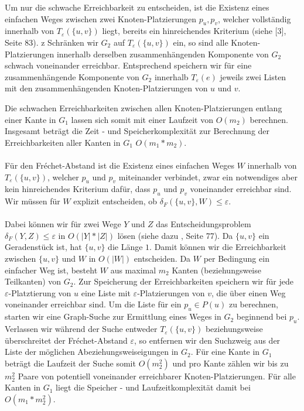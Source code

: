 \documentclass[a4paper, 12pt, twoside]{article}
\theoremstyle{Format1} %
\begin{document}
Um nur die schwache Erreichbarkeit zu entscheiden, ist die Existenz eines einfachen Weges zwischen zwei Knoten-Platzierungen
$p_u,p_v$, welcher vollständig innerhalb von $T_{\varepsilon}(\{u,v\})$ liegt, bereits ein hinreichendes Kriterium (siehe [3], Seite 83).
z
Schränken wir $G_2$ auf $T_{\varepsilon}(\{u,v\})$ ein, so sind alle Knoten-Platzierungen innerhalb derselben zusammenhängenden Komponente von $G_2$
schwach voneinander erreichbar. Entsprechend speichern wir für eine zusammenhängende Komponente von $G_2$ innerhalb $T_{\varepsilon}(e)$ jeweils zwei Listen mit den
zusammenhängenden Knoten-Platzierungen von $u$ und $v$.

Die schwachen Erreichbarkeiten zwischen allen Knoten-Platzierungen entlang einer Kante in $G_1$ lassen sich somit mit einer Laufzeit von $O(m_2)$ berechnen.
Insgesamt beträgt die Zeit - und Speicherkomplexität zur Berechnung der Erreichbarkeiten aller Kanten in $G_1$ $O(m_1*m_2)$.
\\
\\
Für den Fréchet-Abstand ist die Existenz eines einfachen Weges $W$ innerhalb von $T_{\varepsilon}(\{u,v\})$, welcher $p_u$ und $p_v$ miteinander verbindet,
zwar ein notwendiges aber kein hinreichendes Kriterium dafür, dass $p_u$ und $p_v$ voneinander erreichbar sind. Wir müssen für $W$ explizit entscheiden,
ob $\delta_F(\{u,v\}, W) \leq \varepsilon$.
\\
\\
Dabei können wir für zwei Wege $Y$ und $Z$ das Entscheidungsproblem $\delta_F(Y,Z) \leq \varepsilon$ in $O(|Y|*|Z|)$ lösen (siehe dazu \cite{Alt}, Seite 77).
Da $\{u,v\}$ ein Geradenstück ist, hat $\{u,v\}$ die Länge $1$. Damit können wir die Erreichbarkeit zwischen $\{u,v\}$ und $W$ in $O(|W|)$ entscheiden.
Da $W$ per Bedingung ein einfacher Weg ist, besteht $W$ aus maximal $m_2$ Kanten (beziehungsweise Teilkanten) von $G_2$.
Zur Speicherung der Erreichbarkeiten speichern wir für jede $\varepsilon$-Platztierung von $u$ eine Liste mit $\varepsilon$-Platzierungen von $v$, die
über einen Weg voneinander erreichbar sind. Um die Liste für ein $p_u \in P(u)$ zu berechnen, starten wir eine Graph-Suche zur Ermittlung eines
Weges in $G_2$ beginnend bei $p_u$. Verlassen wir während der Suche entweder $T_{\varepsilon}(\{u,v\})$ beziehungsweise überschreitet der Fréchet-Abstand $\varepsilon$,
so entfernen wir den Suchzweig aus der Liste der möglichen Abeziehungsweiseigungen in $G_2$.
Für eine Kante in $G_1$ beträgt die Laufzeit der Suche somit $O(m_2^2)$ und pro Kante zählen wir bis zu $m_2^2$ Paare von potentiell voneinander erreichbarer Knoten-Platzierungen.
Für alle Kanten in $G_1$ liegt die Speicher - und Laufzeitkomplexität damit bei $O(m_1*m_2^2)$.
\end{document}
